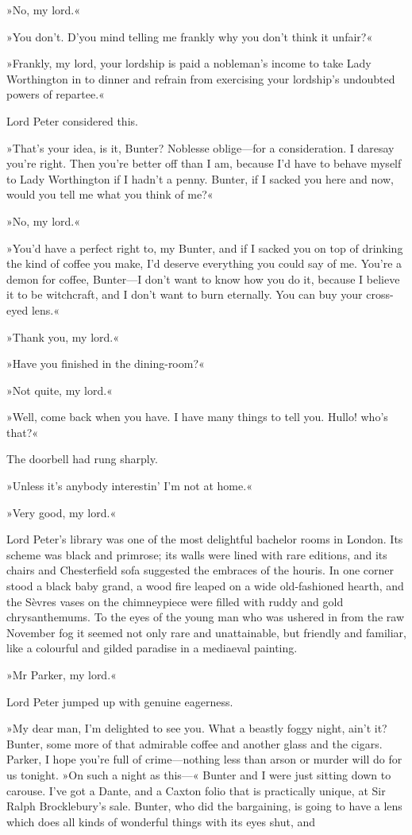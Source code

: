 »No, my lord.«

»You don't. D'you mind telling me frankly why you don't think it unfair?«

»Frankly, my lord, your lordship is paid a nobleman's income to take Lady Worthington in to dinner and refrain from exercising your lordship's undoubted powers of repartee.«

Lord Peter considered this.

»That's your idea, is it, Bunter? Noblesse oblige—for a consideration. I daresay you're right. Then you're better off than I am, because I'd have to behave myself to Lady Worthington if I hadn't a penny. Bunter, if I sacked you here and now, would you tell me what you think of me?«

»No, my lord.«

»You'd have a perfect right to, my Bunter, and if I sacked you on top of drinking the kind of coffee you make, I'd deserve everything you could say of me. You're a demon for coffee, Bunter—I don't want to know how you do it, because I believe it to be witchcraft, and I don't want to burn eternally. You can buy your cross-eyed lens.«

»Thank you, my lord.«

»Have you finished in the dining-room?«

»Not quite, my lord.«

»Well, come back when you have. I have many things to tell you. Hullo! who's that?«

The doorbell had rung sharply.

»Unless it's anybody interestin' I'm not at home.«

»Very good, my lord.«

Lord Peter's library was one of the most delightful bachelor rooms in London. Its scheme was black and primrose; its walls were lined with rare editions, and its chairs and Chesterfield sofa suggested the embraces of the houris. In one corner stood a black baby grand, a wood fire leaped on a wide old-fashioned hearth, and the Sèvres vases on the chimneypiece were filled with ruddy and gold chrysanthemums. To the eyes of the young man who was ushered in from the raw November fog it seemed not only rare and unattainable, but friendly and familiar, like a colourful and gilded paradise in a mediaeval painting.

»Mr Parker, my lord.«

Lord Peter jumped up with genuine eagerness.

»My dear man, I'm delighted to see you. What a beastly foggy night, ain't it? Bunter, some more of that admirable coffee and another glass and the cigars. Parker, I hope you're full of crime—nothing less than arson or murder will do for us tonight. »On such a night as this---« Bunter and I were just sitting down to carouse. I've got a Dante, and a Caxton folio that is practically unique, at Sir Ralph Brocklebury's sale. Bunter, who did the bargaining, is going to have a lens which does all kinds of wonderful things with its eyes shut, and

